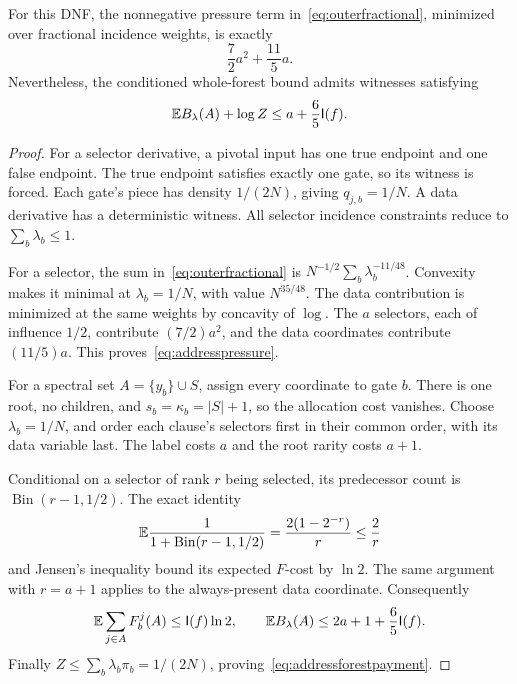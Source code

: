 \begin{proposition}\label{prop:addressforest}
For this DNF, the nonnegative pressure term in~\eqref{eq:outerfractional}, minimized over fractional incidence weights, is exactly
\begin{equation}\label{eq:addresspressure}
 \frac72a^2+\frac{11}{5}a.
\end{equation}
Nevertheless, the conditioned whole-forest bound admits witnesses satisfying
\begin{equation}\label{eq:addressforestpayment}
 \mathbb E B_\lambda(A)+\log Z\le a+\frac65\mathsf I(f).
\end{equation}
\end{proposition}
\begin{proof}
For a selector derivative, a pivotal input has one true endpoint and one false endpoint. The true endpoint satisfies exactly one gate, so its witness is forced. Each gate's piece has density $1/(2N)$, giving $q_{j,b}=1/N$. A data derivative has a deterministic witness. All selector incidence constraints reduce to $\sum_b\lambda_b\le1$.

For a selector, the sum in~\eqref{eq:outerfractional} is $N^{-1/2}\sum_b\lambda_b^{-11/48}$. Convexity makes it minimal at $\lambda_b=1/N$, with value $N^{35/48}$. The data contribution is minimized at the same weights by concavity of $\log$. The $a$ selectors, each of influence $1/2$, contribute $(7/2)a^2$, and the data coordinates contribute $(11/5)a$. This proves~\eqref{eq:addresspressure}.

For a spectral set $A=\{y_b\}\cup S$, assign every coordinate to gate $b$. There is one root, no children, and $s_b=\kappa_b=|S|+1$, so the allocation cost vanishes. Choose $\lambda_b=1/N$, and order each clause's selectors first in their common order, with its data variable last. The label costs $a$ and the root rarity costs $a+1$.

Conditional on a selector of rank $r$ being selected, its predecessor count is $\operatorname{Bin}(r-1,1/2)$. The exact identity
\[
 \mathbb E\frac1{1+\operatorname{Bin}(r-1,1/2)}
 =\frac{2(1-2^{-r})}{r}\le\frac2r
\]
and Jensen's inequality bound its expected $F$-cost by $\ln2$. The same argument with $r=a+1$ applies to the always-present data coordinate. Consequently
\[
 \mathbb E\sum_{j\in A}F_b^j(A)\le\mathsf I(f)\ln2,
 \qquad \mathbb E B_\lambda(A)\le2a+1+\frac65\mathsf I(f).
\]
Finally $Z\le\sum_b\lambda_b\pi_b=1/(2N)$, proving~\eqref{eq:addressforestpayment}.
\end{proof}

